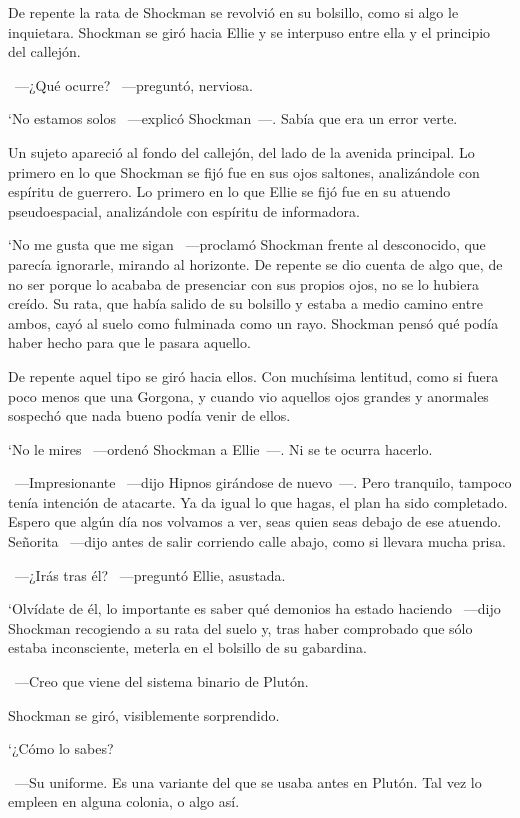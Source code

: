De repente la rata de Shockman se revolvió en su bolsillo, como si algo le inquietara. Shockman se giró hacia Ellie y se interpuso entre ella y el principio del callejón.

~---¿Qué ocurre? ~---preguntó, nerviosa.

‘No estamos solos ~---explicó Shockman~---. Sabía que era un error verte.

Un sujeto apareció al fondo del callejón, del lado de la avenida principal. Lo primero en lo que Shockman se fijó fue en sus ojos saltones, analizándole con espíritu de guerrero. Lo primero en lo que Ellie se fijó fue en su atuendo pseudoespacial, analizándole con espíritu de informadora.

‘No me gusta que me sigan ~---proclamó Shockman frente al desconocido, que parecía ignorarle, mirando al horizonte. De repente se dio cuenta de algo que, de no ser porque lo acababa de presenciar con sus propios ojos, no se lo hubiera creído. Su rata, que había salido de su bolsillo y estaba a medio camino entre ambos, cayó al suelo como fulminada como un rayo. Shockman pensó qué podía haber hecho para que le pasara aquello.

De repente aquel tipo se giró hacia ellos. Con muchísima lentitud, como si fuera poco menos que una Gorgona, y cuando vio aquellos ojos grandes y anormales sospechó que nada bueno podía venir de ellos.

‘No le mires ~---ordenó Shockman a Ellie~---. Ni se te ocurra hacerlo.

~---Impresionante ~---dijo Hipnos girándose de nuevo~---. Pero tranquilo, tampoco tenía intención de atacarte. Ya da igual lo que hagas, el plan ha sido completado. Espero que algún día nos volvamos a ver, seas quien seas debajo de ese atuendo. Señorita ~---dijo antes de salir corriendo calle abajo, como si llevara mucha prisa.

~---¿Irás tras él? ~---preguntó Ellie, asustada.

‘Olvídate de él, lo importante es saber qué demonios ha estado haciendo ~---dijo Shockman recogiendo a su rata del suelo y, tras haber comprobado que sólo estaba inconsciente, meterla en el bolsillo de su gabardina.

~---Creo que viene del sistema binario de Plutón.

Shockman se giró, visiblemente sorprendido.

‘¿Cómo lo sabes?

~---Su uniforme. Es una variante del que se usaba antes en Plutón. Tal vez lo empleen en alguna colonia, o algo así.

